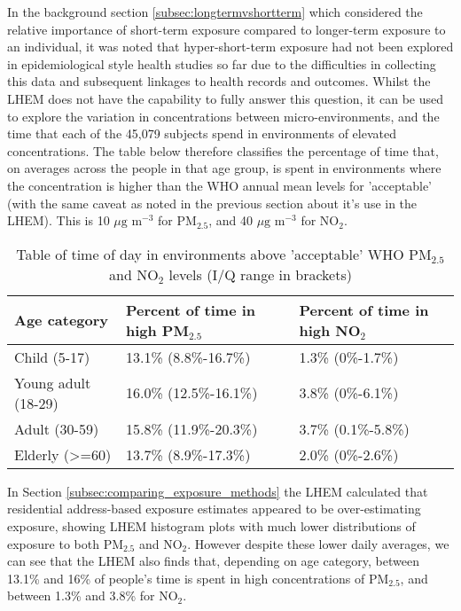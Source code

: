 In the background section \ref{subsec:longtermvshortterm} which considered the relative importance of short-term exposure compared to longer-term exposure to an individual, it was noted that hyper-short-term exposure had not been explored in epidemiological style health studies so far due to the difficulties in collecting this data and subsequent linkages to health records and outcomes. Whilst the LHEM does not have the capability to fully answer this question, it can be used to explore the variation in concentrations between micro-environments, and the time that each of the 45,079 subjects spend in environments of elevated concentrations. The table below therefore classifies the percentage of time that, on averages across the people in that age group, is spent in environments where the concentration is higher than the WHO annual mean levels for 'acceptable' (with the same caveat as noted in the previous section about it's use in the LHEM). This is 10 $\mu \text{g m}^{-3}$ for PM$_{2.5}$, and 40 $\mu \text{g m}^{-3}$ for NO$_{2}$.

\begin{table}[H]
\centering
    \begin{tabular}{ | l | l | l | }
    \hline 
     Age category & Percent of time in high PM$_{2.5}$ & Percent of time in high NO$_{2}$ \\ \hline
     Child (5-17) & 13.1\% (8.8\%-16.7\%) & 1.3\% (0\%-1.7\%) \\ \hline
     Young adult (18-29) & 16.0\% (12.5\%-16.1\%) & 3.8\% (0\%-6.1\%) \\ \hline
     Adult (30-59) & 15.8\% (11.9\%-20.3\%) & 3.7\% (0.1\%-5.8\%) \\ \hline
     Elderly (\textgreater=60) & 13.7\% (8.9\%-17.3\%) & 2.0\% (0\%-2.6\%) \\ \hline
    \end{tabular}
\caption{Table of time of day in environments above 'acceptable' WHO PM$_{2.5}$ and NO$_{2}$ levels (I/Q range in brackets)}
\label{tab:people_time_above}
\end{table}

In Section \ref{subsec:comparing_exposure_methods} the LHEM calculated that residential address-based exposure estimates appeared to be over-estimating exposure, showing LHEM histogram plots with much lower distributions of exposure to both PM$_{2.5}$ and NO$_{2}$. However despite these lower daily averages, we can see that the LHEM also finds that, depending on age category, between 13.1\% and 16\% of people's time is spent in high concentrations of PM$_{2.5}$, and between 1.3\% and 3.8\% for NO$_{2}$.

